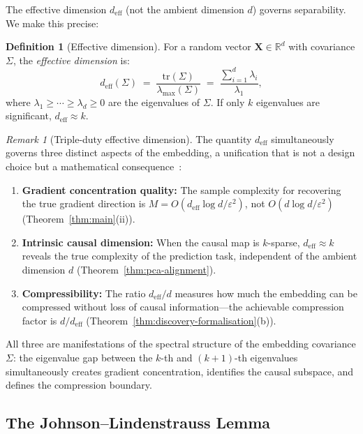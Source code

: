 \documentclass[11pt,a4paper]{article}
\theoremstyle{plain}
\theoremstyle{definition}
\newtheorem{definition}[theorem]{Definition}
\theoremstyle{remark}
\newtheorem{remark}[theorem]{Remark}
\newcommand{\R}{\mathbb{R}}
\newcommand{\deff}{d_{\mathrm{eff}}}
\newcommand{\tr}{\mathrm{tr}}
\begin{document}
The effective dimension $\deff$ (not the ambient dimension $d$) governs
separability.  We make this precise:

\begin{definition}[Effective dimension]\label{def:deff}
For a random vector $\mathbf{X} \in \R^d$ with covariance $\Sigma$, the
\emph{effective dimension} is:
\begin{equation}\label{eq:deff}
  \deff(\Sigma) \;=\; \frac{\tr(\Sigma)}{\lambda_{\max}(\Sigma)}
  \;=\; \frac{\sum_{i=1}^{d} \lambda_i}{\lambda_1},
\end{equation}
where $\lambda_1 \geq \cdots \geq \lambda_d \geq 0$ are the eigenvalues of
$\Sigma$.  If only $k$ eigenvalues are significant, $\deff \approx k$.
\end{definition}

\begin{remark}[Triple-duty effective dimension]\label{rmk:triple-duty}
The quantity $\deff$ simultaneously governs three distinct aspects of the
embedding, a unification that is not a design choice but a mathematical
consequence~\citep[cf.\ the triple-duty evidence weight, \S10.3]{omega2026}:
\begin{enumerate}[leftmargin=2em,itemsep=1pt]
  \item \textbf{Gradient concentration quality:} The sample complexity for
    recovering the true gradient direction is
    $M = O(\deff\log d / \varepsilon^2)$, not $O(d\log d/\varepsilon^2)$
    (Theorem~\ref{thm:main}(ii)).
  \item \textbf{Intrinsic causal dimension:} When the causal map is $k$-sparse,
    $\deff \approx k$ reveals the true complexity of the prediction task,
    independent of the ambient dimension $d$
    (Theorem~\ref{thm:pca-alignment}).
  \item \textbf{Compressibility:} The ratio $\deff/d$ measures how much the
    embedding can be compressed without loss of causal information---the
    achievable compression factor is $d/\deff$
    (Theorem~\ref{thm:discovery-formalisation}(b)).
\end{enumerate}
All three are manifestations of the spectral structure of the embedding
covariance $\Sigma$: the eigenvalue gap between the $k$-th and $(k{+}1)$-th
eigenvalues simultaneously creates gradient concentration, identifies the causal
subspace, and defines the compression boundary.
\end{remark}

\subsection{The Johnson--Lindenstrauss Lemma}\label{sec:jl}
\end{document}
